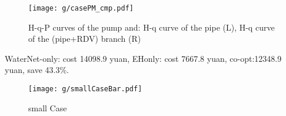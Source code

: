 \documentclass[journal,twoside,web]{ieeecolor}
\begin{document}
\begin{figure}[htbp]
    \centering
    \texttt{[image: g/casePM\_cmp.pdf]}
    \caption{H-q-P curves of the pump and: H-q curve of the pipe (L), H-q curve of the (pipe+RDV) branch (R)}
    \label{pmpicros}
\end{figure}

WaterNet-only: cost 14098.9 yuan, EHonly: cost 7667.8 yuan, co-opt:12348.9 yuan, save 43.3\%.


\begin{figure}[htbp]
    \centering
    \texttt{[image: g/smallCaseBar.pdf]}
    \caption{small Case}
    \label{smallCaseBar}
\end{figure}










\end{document}
